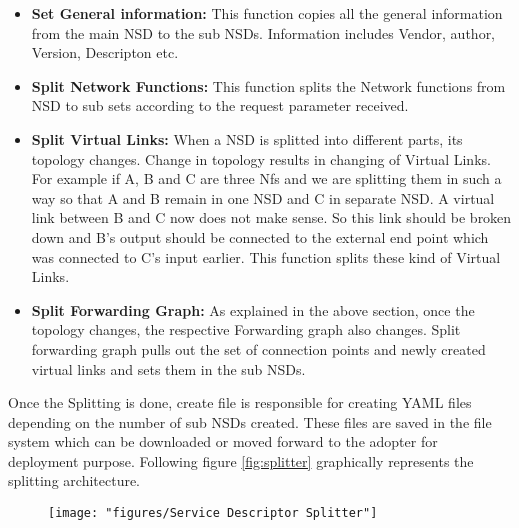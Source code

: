 \begin{itemize}
	\item \textbf{Set General information: }This function copies all the general information from the main NSD to the sub NSDs. Information includes Vendor, author, Version, Descripton etc.
	\item \textbf{Split Network Functions: }This function splits the Network functions from NSD to sub sets according to the request parameter received. 
	\item \textbf{Split Virtual Links: }When a NSD is splitted into different parts, its topology changes. Change in topology results in changing of Virtual Links. For example if A, B and C are three Nfs and we are splitting them in such a way so that A and B remain in one NSD and C in separate NSD. A virtual link between B and C now does not make sense. So this link should be broken down and B’s output should be connected to the external end point which was connected to C’s input earlier. This function splits these kind of Virtual Links.
	\item \textbf{Split Forwarding Graph: }As explained in the above section, once the topology changes, the respective Forwarding graph also changes. Split forwarding graph pulls out the set of connection points and newly created virtual links and sets them in the sub NSDs.
\end{itemize} 

Once the Splitting is done, create file is responsible for creating YAML files depending on the number of sub NSDs created. These files are saved in the file system which can be downloaded or moved forward to the adopter for deployment purpose. Following figure \ref{fig:splitter} graphically represents the splitting architecture.

\begin{figure}
	\centering
	\texttt{[image: "figures/Service Descriptor Splitter"]}
	\caption{}
	\label{fig:service-descriptor-splitter}
\end{figure}
